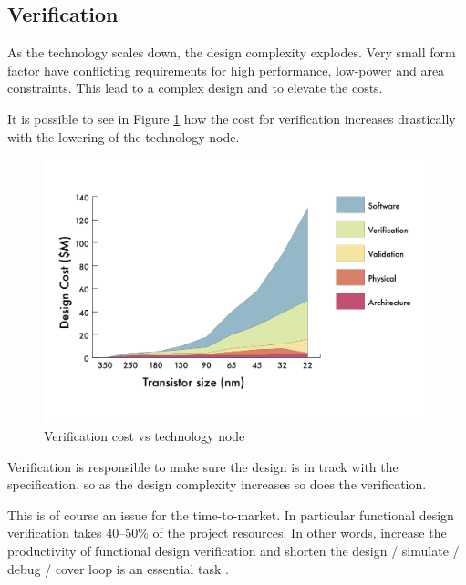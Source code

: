 \subsection{Verification}
As the technology scales down, the design complexity explodes. 
Very small form factor have conflicting requirements for high performance, low-power and area constraints. 
This lead to a complex design and to elevate the costs.

It is possible to see in Figure \ref{verification-tecnology} how the cost for verification increases drastically with the lowering of the technology node.


\begin{figure}[H]
    \centering
    \includegraphics[scale = 0.4]{Chapter_1/img/cost-scale.png}
    \caption{Verification cost vs technology node \cite{verification-book-2018}}
    \label{verification-tecnology}
\end{figure}

Verification is responsible to make sure the design is in track with the specification, so as the design complexity increases so does the verification.

This is of course an issue for the time-to-market. 
In particular functional design verification takes 40–50\% of the project resources. In other words, increase the productivity of functional design verification and shorten the design / simulate / debug / cover loop is an essential task \cite{verification-book-2018}.

